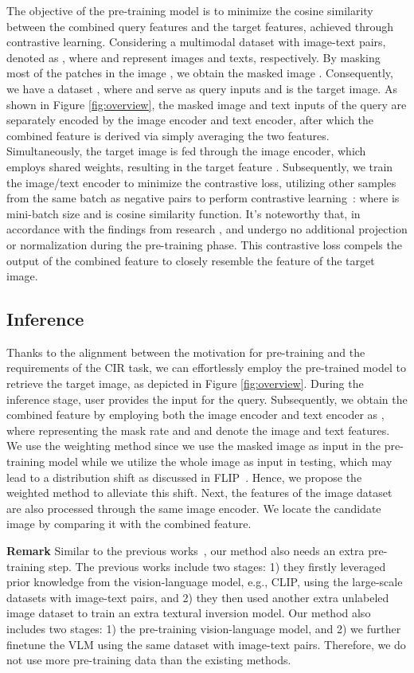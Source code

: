 \documentclass[10pt,twocolumn,letterpaper]{article}
\begin{document}
The objective of the pre-training model is to minimize the cosine similarity between the combined query features and the target features, achieved through contrastive learning. Considering a multimodal dataset with image-text pairs, denoted as , where  and  represent images and texts, respectively. By masking most of the patches in the image , we obtain the masked image . Consequently, we have a dataset , where  and  serve as query inputs and  is the target image. As shown in Figure \ref{fig:overview}, the masked image and text inputs of the query are separately encoded by the image encoder and text encoder, after which the combined feature  is derived via simply averaging the two features. Simultaneously, the target image  is fed through the image encoder, which employs shared weights, resulting in the target feature . Subsequently, we train the image/text encoder to minimize the contrastive loss, utilizing other samples from the same batch as negative pairs to perform contrastive learning~\cite{chen2020simple}:
 where  is mini-batch size and  is cosine similarity function. It's noteworthy that, in accordance with the findings from research \cite{liu2023bi},  and  undergo no additional projection or normalization during the pre-training phase. This contrastive loss compels the output of the combined feature to closely resemble the feature of the target image.

\subsection{Inference}
Thanks to the alignment between the motivation for pre-training and the requirements of the CIR task, we can effortlessly employ the pre-trained model to retrieve the target image, as depicted in Figure \ref{fig:overview}. During the inference stage, user provides the input  for the query. Subsequently, we obtain the combined feature  by employing both the image encoder and text encoder as , where  representing the mask rate and  and  denote the image and text features. We use the weighting method since we use the masked image as input in the pre-training model while we utilize the whole image as input in testing, which may lead to a distribution shift as discussed in FLIP~\cite{li2023scaling}. Hence, we propose the weighted method to alleviate this shift. Next, the features of the image dataset are also processed through the same image encoder. We locate the candidate image  by comparing it with the combined feature. 


\textbf{Remark} Similar to the previous works~\cite{saito2023pic2word,Baldrati_2023_ICCV}, our method also needs an extra pre-training step. The previous works include two stages: 1) they firstly leveraged prior knowledge from the vision-language model, e.g., CLIP, using the large-scale datasets with image-text pairs, and 2) they then used another extra unlabeled image dataset to train an extra textural inversion model. Our method also includes two stages: 1) the pre-training vision-language model, and 2) we further finetune the VLM using the same dataset with image-text pairs. Therefore, we do not use more pre-training data than the existing methods.
\end{document}
